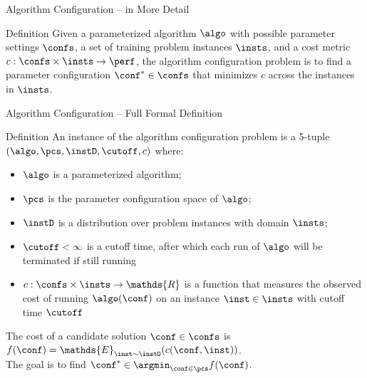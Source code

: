 \begin{frame}[c]{Algorithm Configuration -- in More Detail}

\bigskip

\centering
\scalebox{0.75}{
	
}

\bigskip

\begin{block}{Definition}
	Given a parameterized algorithm $\algo$ with possible parameter settings $\confs$, \pause 
	a set of training problem instances $\insts$, \pause 
	and a cost metric $c: \confs \times \insts \rightarrow \perf$, \pause 
	the algorithm configuration problem is 
	to \alert{find a parameter configuration $\conf^* \in \confs$ 
		that minimizes $c$ across the instances in $\insts$}.
\end{block}

\end{frame}


\begin{frame}[c]{Algorithm Configuration -- Full Formal Definition}

\begin{block}{Definition}
An instance of the algorithm configuration problem
is a 5-tuple $(\algo, \pcs, \instD, \cutoff, c)$ where:
\begin{itemize}
	\item $\algo$ is a parameterized algorithm;
	\item $\pcs$ is the parameter configuration space of $\algo$;
	\item $\instD$ is a distribution over problem instances with domain $\insts$;
	\pause
	\item $\cutoff < \infty$ is a \alert{cutoff time}, after which each run of $\algo$ will be terminated if still running
	\pause
	\item $c: \confs \times \insts \rightarrow \mathds{R}$ is a function that
	measures the observed cost of running $\algo(\conf)$ on an instance $\inst \in
	\insts$ with cutoff time $\cutoff$ 
\end{itemize}
\pause
The cost of a candidate solution $\conf\in\confs$ is
\alert{$f(\conf) = \mathds{E}_{\inst \sim \instD} (c(\conf,\inst))$}.\\
The goal is to find \alert{$\conf^* \in \argmin_{\conf \in \pcs} f(\conf)$}.

\end{block}

\end{frame}

